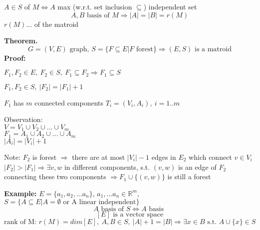\begin{definition}
	$A\in S$  of $M \Leftrightarrow A$ max (w.r.t. set inclusion $\subseteq$) independent set
	\[
	A, B \text{ basis of } M \Rightarrow |A| = |B| = r(M)
	\]
	$r(M)$...  of the matroid
\end{definition}

\textbf{Theorem.}
\[G=(V,E) \text{ graph, }S=\{F\subseteq E | F \text{ forest}\} \Rightarrow (E,S) \text{ is a matroid}\]
\textbf{Proof:}
\begin{compactenum}[(1)]
	\item{$F_1, F_2 \in E,~F_2\in S,~F_1\subseteq F_2\Rightarrow F_1\subseteq S$}
	\item{$F_1, F_2\in S, ~|F_2| = |F_1| + 1$}
	\item{$F_1$} has $m$ connected components $T_i=(V_i, A_i),~i=1..m$
	\item{Observation: \\
	$V=V_1\cup V_2\cup ... \cup V_m$\\
	$F_1 = A_1\cup A_2\cup ... \cup A_m$\\
	$|A_i|=|V_i|+1$}
	\item{}
	\item{Note: $F_2$ is forest $\Rightarrow$ there are at most $|V_i|-1$ edges in $E_2$ which connect $v\in V_i$ $|F_2| > |F_1| \Rightarrow \exists v,w $ in different components, s.t. $(v,w)$ is an edge of $F_2$ connecting these two components $\Rightarrow F_1\cup\{(v,w)\}$ is still a forest}
\end{compactenum}


\textbf{Example:} $E=\{a_1, a_2, ... a_n\}$, $a_1, ... a_n \in \mathbb{R}^m$,
$S = \{A\subseteq E | A=\emptyset \text{ or A linear independent}\}$\\
\[A \text{ basis of } S \Leftrightarrow A \text{ basis }
\]
\[
	[E] \text{ is a vector space}
\]
\[
	\text{rank of M: } r(M) = dim[E],~A,B\in S,~|A|+1=|B|\Rightarrow \exists x\in B \text{ s.t. } A\cup \{x\}\in S
\]

